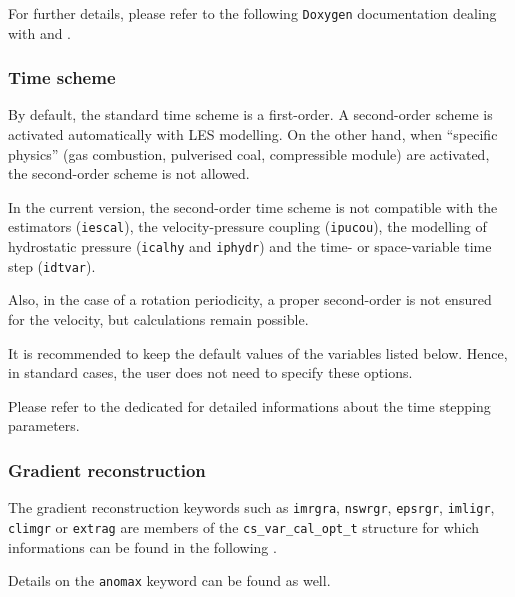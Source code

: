 For further details, please refer to the following \texttt{Doxygen} documentation
dealing with  and
.

\subsubsection{Time scheme}

By default, the standard time scheme is a first-order.
A second-order scheme is activated automatically with LES modelling.
On the other hand, when ``specific physics'' (gas combustion, pulverised coal,
compressible module) are activated, the second-order scheme is not allowed.

In the current version, the second-order time scheme is not compatible
with the estimators ({\tt iescal}), the velocity-pressure coupling
({\tt ipucou}), the modelling of hydrostatic pressure ({\tt icalhy} and
{\tt iphydr}) and the time- or space-variable time step ({\tt idtvar}).

Also, in the case of a rotation periodicity, a proper second-order is not
ensured for the velocity, but calculations remain possible.

It is recommended to keep the default values of the variables listed
below. Hence, in standard cases, the user does not need to specify these
options.

Please refer to the dedicated
for detailed informations about the time stepping parameters.

\subsubsection{Gradient reconstruction}

The gradient reconstruction keywords such as \texttt{imrgra}, \texttt{nswrgr},
\texttt{epsrgr}, \texttt{imligr}, \texttt{climgr} or \texttt{extrag} are members
of the \texttt{cs\_var\_cal\_opt\_t} structure for which informations can be
found in the following .

Details on the \texttt{anomax} keyword can be found
 as well.

